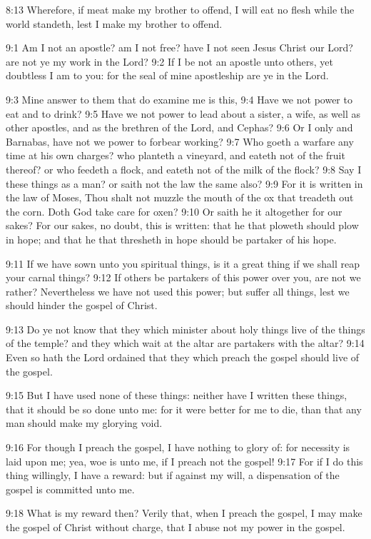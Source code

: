 8:13 Wherefore, if meat make my brother to offend, I will eat no flesh
while the world standeth, lest I make my brother to offend.

9:1 Am I not an apostle? am I not free? have I not seen Jesus Christ
our Lord? are not ye my work in the Lord?  9:2 If I be not an apostle
unto others, yet doubtless I am to you: for the seal of mine
apostleship are ye in the Lord.

9:3 Mine answer to them that do examine me is this, 9:4 Have we not
power to eat and to drink?  9:5 Have we not power to lead about a
sister, a wife, as well as other apostles, and as the brethren of the
Lord, and Cephas?  9:6 Or I only and Barnabas, have not we power to
forbear working?  9:7 Who goeth a warfare any time at his own charges?
who planteth a vineyard, and eateth not of the fruit thereof? or who
feedeth a flock, and eateth not of the milk of the flock?  9:8 Say I
these things as a man? or saith not the law the same also?  9:9 For it
is written in the law of Moses, Thou shalt not muzzle the mouth of the
ox that treadeth out the corn. Doth God take care for oxen?  9:10 Or
saith he it altogether for our sakes? For our sakes, no doubt, this is
written: that he that ploweth should plow in hope; and that he that
thresheth in hope should be partaker of his hope.

9:11 If we have sown unto you spiritual things, is it a great thing if
we shall reap your carnal things?  9:12 If others be partakers of this
power over you, are not we rather?  Nevertheless we have not used this
power; but suffer all things, lest we should hinder the gospel of
Christ.

9:13 Do ye not know that they which minister about holy things live of
the things of the temple? and they which wait at the altar are
partakers with the altar?  9:14 Even so hath the Lord ordained that
they which preach the gospel should live of the gospel.

9:15 But I have used none of these things: neither have I written
these things, that it should be so done unto me: for it were better
for me to die, than that any man should make my glorying void.

9:16 For though I preach the gospel, I have nothing to glory of: for
necessity is laid upon me; yea, woe is unto me, if I preach not the
gospel!  9:17 For if I do this thing willingly, I have a reward: but
if against my will, a dispensation of the gospel is committed unto me.

9:18 What is my reward then? Verily that, when I preach the gospel, I
may make the gospel of Christ without charge, that I abuse not my
power in the gospel.

